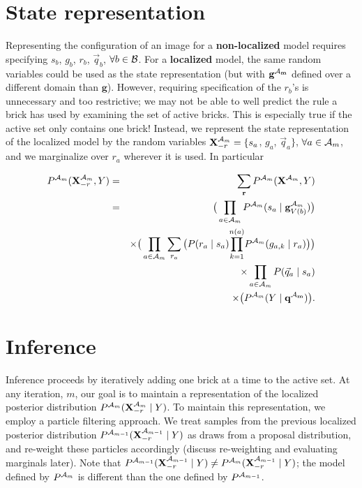 \documentclass[11pt]{article}
\newcommand{\A}{{\cal A}}
\newcommand{\X}{\mathbf{X}}
\newcommand{\B}{\cal B}
\newcommand{\Xrm}{\X^{\Am}_{-r}}
\newcommand{\Am}{\A_{m}}
\newcommand{\qb}{\vec{q}_b}
\newcommand{\qa}{\vec{q}_a}
\begin{document}
\section*{State representation}

Representing the configuration of an image for a \textbf{non-localized} model requires specifying $s_b$, $g_b$, $r_b$, $\qb$, $\forall b \in \B$. For a \textbf{localized} model, the same random variables could be used as the state representation (but with $\mathbf{g^{\Am}}$ defined over a different domain than $\mathbf{g}$). However, requiring specification of the $r_b$'s is unnecessary and too restrictive; we may not be able to well predict the rule a brick has used by examining the set of active bricks. This is especially true if the active set only contains one brick! Instead, we represent the state representation of the localized model by the random variables $\Xrm = \{s_a$, $g_a$, $\qa\}$, $\forall a \in \Am$, and we marginalize over $r_a$ wherever it is used. In particular

\begin{eqnarray}
P^{\Am}(\Xrm, Y) &=& \sum_{\mathbf{r}} P^{\Am}(\X^{\Am}, Y)  \\
&=& \big( \prod_{a \in {\Am}} P^{\Am}(s_a \mid \mathbf{g}^{\Am}_{V({b})}) \big ) \label{eqn.localJointXrm} \\
& & \times \big( \prod_{a \in {\Am}} \sum_{r_a} \big(P(r_a \mid s_a) {\displaystyle \prod_{k=1}^{n(a)}} P^{\Am}(g_{a,k} \mid r_a) \big) \big) \nonumber \\
& & \times \prod_{a \in {\Am}} P(\qa \mid s_a) \nonumber \\
& & \times \big( P^{\Am}(Y \mid \mathbf{q^{\Am}}) \big). \nonumber
\end{eqnarray}

\section*{Inference}

Inference proceeds by iteratively adding one brick at a time to the active set. At any iteration, $m$, our goal is to maintain a representation of the localized posterior distribution $P^{\Am}(\Xrm \mid Y)$. To maintain this representation, we employ a particle filtering approach. We treat samples from the previous localized posterior distribution $P^{\A_{m-1}}(\X^{\A_{m-1}}_{-r} \mid Y)$ as draws from a proposal distribution, and re-weight these particles accordingly (discuss re-weighting and evaluating marginals later). Note that $P^{\A_{m-1}}(\X^{\A_{m-1}}_{-r} \mid Y) \neq P^{\A_{m}}(\X^{\A_{m-1}}_{-r} \mid Y)$; the model defined by $P^{\A_{m}}$ is different than the one defined by $P^{\A_{m-1}}$.
\end{document}
